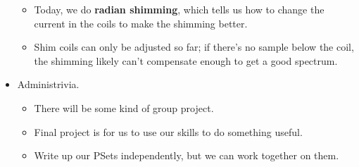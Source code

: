 \documentclass[../notes.tex]{subfiles}
\begin{document}
\begin{itemize}
\begin{itemize}
        \item Today, we do \textbf{radian shimming}, which tells us how to change the current in the coils to make the shimming better.
        \item Shim coils can only be adjusted so far; if there's no sample below the coil, the shimming likely can't compensate enough to get a good spectrum.
    \end{itemize}
    \item Administrivia.
    \begin{itemize}
        \item There will be some kind of group project.
        \item Final project is for us to use our skills to do something useful.
        \item Write up our PSets independently, but we can work together on them.
    \end{itemize}
\end{itemize}
\end{document}
